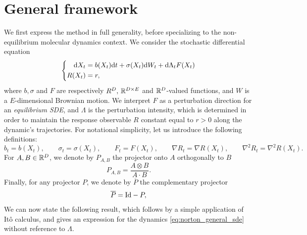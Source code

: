 \section{General framework}
We first express the method in full generality, before specializing to the non-equilibrium molecular dynamics context. We consider the stochastic differential equation
\begin{equation}
    \label{eq:norton_general_sde}
    \left\{\begin{aligned}
        \mathrm{d} X_t &= b(X_t)\mathrm{d} t +\sigma(X_t)\mathrm{d} W_t + \mathrm{d} \Lambda_t F(X_t)\\
        R(X_t)&= r,
    \end{aligned}\right.
\end{equation}
where $b ,\sigma$ and $F$ are respectively $R^D,\, \mathbb{R}^{D\times E}$ and $\mathbb{R}^D$-valued functions, and $W$ is a $E$-dimensional Brownian motion.
We interpret $F$ as a perturbation direction for an \textit{equilibrium SDE}, and $\Lambda$ is the perturbation intensity, which is determined in order to maintain the response observable $R$ constant equal to $r>0$ along the dynamic's trajectories.
For notational simplicity, let us introduce the following definitions:
\begin{equation}
    \label{eq:norton_notation}
    b_t = b(X_t),\qquad \sigma_t = \sigma(X_t),\qquad F_t= F(X_t),\qquad \nabla R_t=\nabla R(X_t),\qquad \nabla^2 R_t = \nabla^2 R(X_t).
\end{equation}
For $A,B\in\mathbb{R}^{D}$, we denote by $P_{A,B}$ the projector onto $A$ orthogonally to $B$
\begin{equation}
    \label{eq:non_orthogonal_projector}
    P_{A,B}=\frac{A\otimes B}{A\cdot B}.
\end{equation}
Finally, for any projector $P$, we denote by $\overline{P}$ the complementary projector
\begin{equation}
    \label{eq:complementary_projector}
    \overline{P}=\mathrm{Id}-P,
\end{equation}
We can now state the following result, which follows by a simple application of Itô calculus, and gives an expression for the dynamics \eqref{eq:norton_general_sde} without reference to $\Lambda$.
